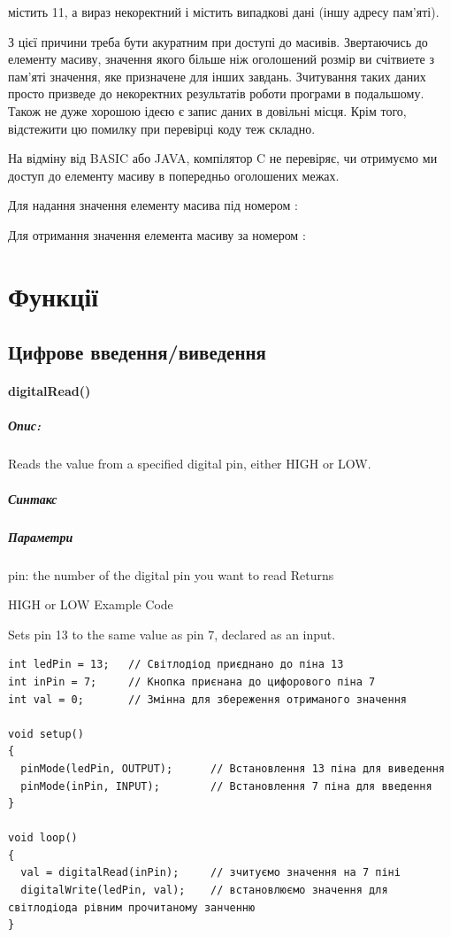 \documentclass[12pt,a4paper]{book}  %
\begin{document}
 містить 11, а вираз  некоректний і містить випадкові дані (іншу адресу пам'яті).

З цієї причини треба бути акуратним при доступі до масивів. Звертаючись до елементу масиву, значення якого більше ніж оголошений розмір ви счітвиете з пам'яті значення, яке призначене для інших завдань. Зчитування таких даних просто призведе до некоректних результатів роботи програми в подальшому. Також не дуже хорошою ідеєю є запис даних в довільні місця. Крім того, відстежити цю помилку при перевірці коду теж складно.

На відміну від BASIC або JAVA, компілятор C не перевіряє, чи отримуємо ми доступ до елементу масиву в попередньо оголошених межах.

Для надання значення елементу масива під номером :


Для отримання значення елемента масиву за номером :


\section{Функції}

\subsection{Цифрове введення/виведення}

\paragraph{digitalRead()}

\subparagraph{Опис:}

Reads the value from a specified digital pin, either HIGH or LOW.
\subparagraph{Синтакс}

\subparagraph{Параметри}

pin: the number of the digital pin you want to read
Returns

HIGH or LOW
Example Code

Sets pin 13 to the same value as pin 7, declared as an input.
\begin{lstlisting}[label=conditionoperator,caption=Використання функції digitalRead()]
int ledPin = 13;   // Світлодіод приєднано до піна 13
int inPin = 7;     // Кнопка приєнана до цифорового піна 7
int val = 0;       // Змінна для збереження отриманого значення

void setup()
{
  pinMode(ledPin, OUTPUT);      // Встановлення 13 піна для виведення
  pinMode(inPin, INPUT);        // Встановлення 7 піна для введення
}

void loop()
{
  val = digitalRead(inPin);     // зчитуємо значення на 7 піні
  digitalWrite(ledPin, val);    // встановлюємо значення для світлодіода рівним прочитаному занченню
}
\end{lstlisting}
\end{document}
